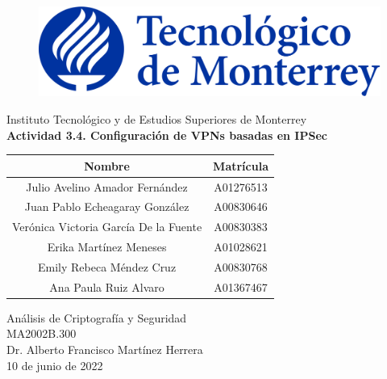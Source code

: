 \documentclass{article}
\begin{document}
    \begin{titlepage}
        \begin{center}
            \begin{figure}
                \centering
                \includegraphics[scale=0.13]{../../img/logo_itesm.png}\\ %
            \end{figure}
        \vspace{5cm}
        \LARGE{Instituto Tecnológico y de Estudios Superiores de Monterrey}\\
        \fontsize{12}{14}\selectfont
        \vspace{1cm}
        \textbf{Actividad 3.4. Configuración de VPNs basadas en IPSec}\\ %
        \vspace{0.7cm}
        \begin{table}[!h]
            \centering
            \begin{tabular}{ ||c|c|| }
                \hline
                Nombre & Matrícula \\
                \hline
                Julio Avelino Amador Fernández & A01276513 \\
                \hline
                Juan Pablo Echeagaray González & A00830646 \\
                \hline
                Verónica Victoria García De la Fuente & A00830383 \\
                \hline
                Erika Martínez Meneses & A01028621 \\
                \hline
                Emily Rebeca Méndez Cruz & A00830768 \\
                \hline
                Ana Paula Ruiz Alvaro & A01367467 \\
                \hline
            \end{tabular}
        \end{table}
        \vspace{0.7cm}
        Análisis de Criptografía y Seguridad\\ %
        \vspace{0.2cm}
        MA2002B.300\\ %
        \vspace{0.2cm}
        Dr. Alberto Francisco Martínez Herrera \\ %
        \vspace{0.7cm}
        10 de junio de 2022\\ %
        \end{center}
    \end{titlepage}
\end{document}
